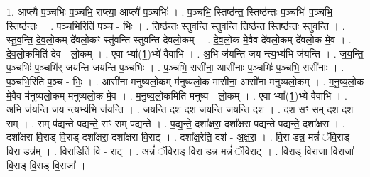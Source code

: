 \documentclass[17pt]{extarticle}
\begin{document}
1. आप्त्यै॑ प॒ञ्चभिः॑ प॒ञ्चभि॒ राप्त्या॒ आप्त्यै॑ प॒ञ्चभिः॑ । . प॒ञ्चभि॒ स्तिष्ठ॑न्त॒ स्तिष्ठ॑न्तः प॒ञ्चभिः॑ प॒ञ्चभि॒ स्तिष्ठ॑न्तः । . प॒ञ्चभि॒रिति॑ प॒ञ्च - भिः॒ । . तिष्ठ॑न्तः स्तुवन्ति स्तुवन्ति॒ तिष्ठ॑न्त॒ स्तिष्ठ॑न्तः स्तुवन्ति । . स्तु॒व॒न्ति॒ दे॒व॒लो॒कम् दे॑वलो॒कꣳ स्तु॑वन्ति स्तुवन्ति देवलो॒कम् । . दे॒व॒लो॒क मे॒वैव दे॑वलो॒कम् दे॑वलो॒क मे॒व । . दे॒व॒लो॒कमिति॑ देव - लो॒कम् । . ए॒वा भ्या᳚(1॒)भ्ये॑ वैवाभि । . अ॒भि ज॑यन्ति जय न्त्य॒भ्य॑भि ज॑यन्ति । . ज॒य॒न्ति॒ प॒ञ्चभिः॑ प॒ञ्चभि॑र् जयन्ति जयन्ति प॒ञ्चभिः॑ । . प॒ञ्चभि॒ रासी॑ना॒ आसी॑नाः प॒ञ्चभिः॑ प॒ञ्चभि॒ रासी॑नाः । . प॒ञ्चभि॒रिति॑ प॒ञ्च - भिः॒ । . आसी॑ना मनुष्यलो॒कम् म॑नुष्यलो॒क मासी॑ना॒ आसी॑ना मनुष्यलो॒कम् । . म॒नु॒ष्य॒लो॒क मे॒वैव म॑नुष्यलो॒कम् म॑नुष्यलो॒क मे॒व । . म॒नु॒ष्य॒लो॒कमिति॑ मनुष्य - लो॒कम् । . ए॒वा भ्या᳚(1॒)भ्ये॑ वैवाभि । . अ॒भि ज॑यन्ति जय न्त्य॒भ्य॑भि ज॑यन्ति । . ज॒य॒न्ति॒ दश॒ दश॑ जयन्ति जयन्ति॒ दश॑ । . दश॒ सꣳ सम् दश॒ दश॒ सम् । . सम् प॑द्यन्ते पद्यन्ते॒ सꣳ सम् प॑द्यन्ते । . प॒द्य॒न्ते॒ दशा᳚क्षरा॒ दशा᳚क्षरा पद्यन्ते पद्यन्ते॒ दशा᳚क्षरा । . दशा᳚क्षरा वि॒राड् वि॒राड् दशा᳚क्षरा॒ दशा᳚क्षरा वि॒राट् । . दशा᳚क्ष॒रेति॒ दश॑ - अ॒क्ष॒रा॒ । . वि॒रा डन्न॒ मन्नं॑ ॅवि॒राड् वि॒रा डन्न᳚म् । . वि॒राडिति॑ वि - राट् । . अन्नं॑ ॅवि॒राड् वि॒रा डन्न॒ मन्नं॑ ॅवि॒राट् । . वि॒राड् वि॒राजा॑ वि॒राजा॑ वि॒राड् वि॒राड् वि॒राजा᳚ । \newline
\end{document}
